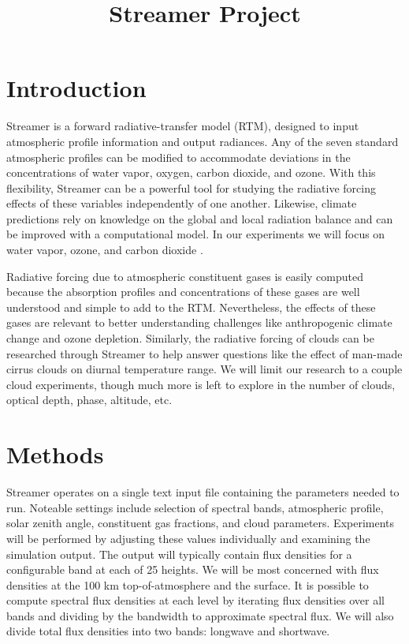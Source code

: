\documentclass[twocol]{ametsoc}
\title{Streamer Project}
\affiliation{}
\begin{document}
\maketitle


%

\section{Introduction}
Streamer is a forward radiative-transfer model (RTM), designed to input atmospheric profile information and output radiances. Any of the seven standard atmospheric profiles can be modified to accommodate deviations in the concentrations of water vapor, oxygen, carbon dioxide, and ozone. With this flexibility, Streamer can be a powerful tool for studying the radiative forcing effects of these variables independently of one another. Likewise, climate predictions rely on knowledge on the global and local radiation balance and can be improved with a computational model. In our experiments we will focus on water vapor, ozone, and carbon dioxide \citep{Key:1998}.

Radiative forcing due to atmospheric constituent gases is easily computed because the absorption profiles and concentrations of these gases are well understood and simple to add to the RTM. Nevertheless, the effects of these gases are relevant to better understanding challenges like anthropogenic climate change and ozone depletion. Similarly, the radiative forcing of clouds can be researched through Streamer to help answer questions like the effect of man-made cirrus clouds on diurnal temperature range. We will limit our research to a couple cloud experiments, though much more is left to explore in the number of clouds, optical depth, phase, altitude, etc.
\section{Methods}
Streamer operates on a single text input file containing the parameters needed to run. Noteable settings include selection of spectral bands, atmospheric profile, solar zenith angle, constituent gas fractions, and cloud parameters. Experiments will be performed by adjusting these values individually and examining the simulation output. The output will typically contain flux densities for a configurable band at each of 25 heights. We will be most concerned with flux densities at the 100 km top-of-atmosphere and the surface. It is possible to compute spectral flux densities at each level by iterating flux densities over all bands and dividing by the bandwidth to approximate spectral flux. We will also divide total flux densities into two bands: longwave and shortwave. 
\end{document}
